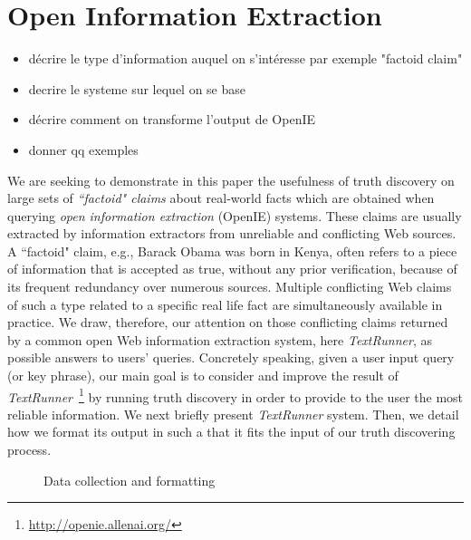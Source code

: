\section{Open Information Extraction}
\begin{itemize}
 \item décrire le type d'information auquel on s'intéresse par exemple "factoid claim"
 \item decrire le systeme sur lequel on se base
 \item décrire comment on transforme l'output de OpenIE
 \item donner qq exemples
\end{itemize}

\medskip

We are seeking to demonstrate in this paper the usefulness of truth discovery on large sets of 
\emph{``factoid" claims} about real-world facts which are obtained when querying \emph{open information
extraction} (OpenIE) systems. These claims are usually extracted by information extractors from unreliable
and conflicting Web sources.
A ``factoid" claim, e.g.,  \textsf{Barack Obama was born in Kenya}, often refers to a piece of 
information that is accepted as true, without any prior verification, because of its frequent redundancy
over numerous sources. Multiple conflicting Web claims of such a type related to a specific real life fact 
are simultaneously available in practice. We draw, therefore, our attention on those conflicting claims 
returned by a common open Web information extraction system, here \emph{TextRunner}, as possible answers to users' queries. 
Concretely speaking, given a user input query (or key phrase), our main goal is to consider and improve the result of \emph{TextRunner}~\footnote{\href{http://openie.allenai.o, rg/}{http://openie.allenai.org/}}
by running truth discovery in order to provide to the user the most reliable information.
We next briefly present \emph{TextRunner} system. Then, we detail how we format its output in such a that
it fits the input of our truth discovering process.


\begin{figure*}[!ht]
\begin{subfigure}[TextRunner Extraction]{Un exemple d'extraction avec TextRunner}
\end{subfigure}
\hfill
\begin{subfigure}[Extracted Triplets]{Un exemple de tripl\'es extraites}
\end{subfigure}
\label{open}\caption{Data collection and formatting}
\end{figure*}

